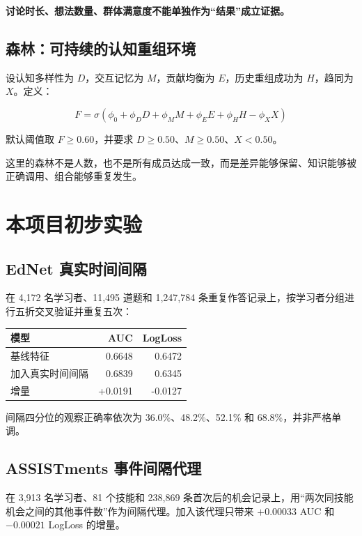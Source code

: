 \documentclass[UTF8,a4paper,11pt]{ctexart}
\newcommand{\warn}[1]{\textcolor{red!70!black}{\textbf{#1}}}
\begin{document}
\warn{讨论时长、想法数量、群体满意度不能单独作为“结果”成立证据。}

\subsection{森林：可持续的认知重组环境}

设认知多样性为 $D$，交互记忆为 $M$，贡献均衡为 $E$，历史重组成功为 $H$，趋同为 $X$。定义：

\begin{equation}
F=\sigma\left(\phi_0+\phi_D D+\phi_M M+\phi_E E+\phi_H H-\phi_X X\right)
\end{equation}

默认阈值取 $F\ge0.60$，并要求 $D\ge0.50$、$M\ge0.50$、$X<0.50$。

这里的森林不是人数，也不是所有成员达成一致，而是差异能够保留、知识能够被正确调用、组合能够重复发生。

\section{本项目初步实验}

\subsection{EdNet 真实时间间隔}

在 4,172 名学习者、11,495 道题和 1,247,784 条重复作答记录上，按学习者分组进行五折交叉验证并重复五次：

\begin{center}
\begin{tabular}{lrr}
\toprule
模型 & AUC & LogLoss \\
\midrule
基线特征 & 0.6648 & 0.6472 \\
加入真实时间间隔 & 0.6839 & 0.6345 \\
\midrule
增量 & +0.0191 & -0.0127 \\
\bottomrule
\end{tabular}
\end{center}

间隔四分位的观察正确率依次为 36.0\%、48.2\%、52.1\% 和 68.8\%，并非严格单调。

\subsection{ASSISTments 事件间隔代理}

在 3,913 名学习者、81 个技能和 238,869 条首次后的机会记录上，用“两次同技能机会之间的其他事件数”作为间隔代理。加入该代理只带来 $+0.00033$ AUC 和 $-0.00021$ LogLoss 的增量。
\end{document}

